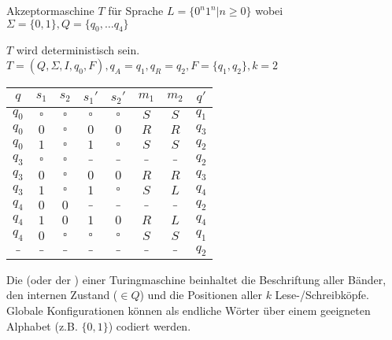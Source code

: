 \begin{beispiel}
\label{nullenundeinsen}

    Akzeptormaschine $T$ für Sprache $L = \{ 0^n 1^n | n \geq 0 \}$ wobei $\Sigma= \{0,1\}, Q = \{q_0, \dots q_4 \}$

    $T$ wird deterministisch sein. $T = (Q, \Sigma, I, q_0, F), q_A = q_1, q_R = q_2, F = \{q_1, q_2\}, k=2$

    \vspace{2pt}
    \begin{tabular}{|c|c|c|c|c|c|c|c|}\hline
    \rowcolor{grau} $q$   & $s_1$     & $s_2$     & $s_1'$    & $s_2'$    & $m_1$ & $m_2$ & $q'$    \\\hline
                    $q_0$ & $\square$ & $\square$ & $\square$ & $\square$ & $S$   & $S$   & $q_1$   \\\hline
                    $q_0$ & $0$       & $\square$ & $0$       & $0$       & $R$   & $R$   & $q_3$   \\\hline
                    $q_0$ & $1$       & $\square$ & $1$       & $\square$ & $S$   & $S$   & $q_2$   \\\hline
                    $q_3$ & $\square$ & $\square$ & $\_$      & $\_$      & $\_$  & $\_$  & $q_2$   \\\hline
                    $q_3$ & $0$       & $\square$ & $0$       & $0$       & $R$   & $R$   & $q_3$   \\\hline
                    $q_3$ & $1$       & $\square$ & $1$       & $\square$ & $S$   & $L$   & $q_4$   \\\hline
                    $q_4$ & $0$       & $0$       & $\_$      & $\_$      & $\_$  & $\_$  & $q_2$   \\\hline
                    $q_4$ & $1$       & $0$       & $1$       & $0$       & $R$   & $L$   & $q_4$   \\\hline
                    $q_4$ & $0$       & $\square$ & $\square$ & $\square$ & $S$   & $S$   & $q_1$   \\\hline
                    $\_$  & $\_$      & $\_$      & $\_$      & $\_$      & $\_$  & $\_$  & $q_2$   \\\hline
    \end{tabular}

\end{beispiel}


Die  (oder der ) einer Turingmaschine beinhaltet die Beschriftung aller Bänder, den internen Zustand ($\in Q$) und die Positionen aller $k$ Lese-/Schreibköpfe. Globale Konfigurationen können als endliche Wörter über einem geeigneten Alphabet (z.B. $\{0,1\}$) codiert werden.


